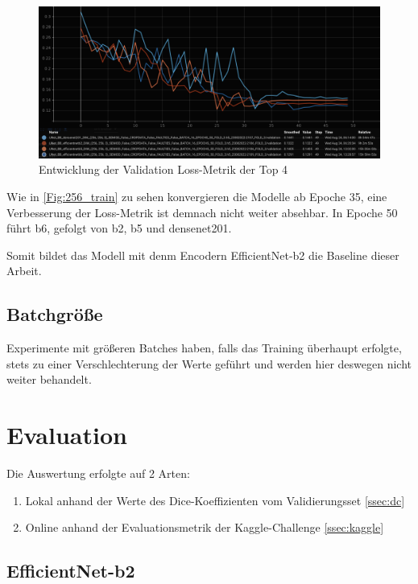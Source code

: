 \begin{figure}[H]
	\begin{center}
		\includegraphics[width=400pt]{LaTex/bilder/256_val_loss.png}
		\caption{Entwicklung der Validation Loss-Metrik der Top 4}\label{Fig:256_train}
	\end{center}
\end{figure}

Wie in \autoref{Fig:256_train} zu sehen konvergieren die Modelle ab Epoche 35, eine Verbesserung der Loss-Metrik ist demnach nicht weiter absehbar. In Epoche 50 führt b6, gefolgt von b2, b5 und densenet201. 

Somit bildet das Modell mit denm Encodern EfficientNet-b2 die Baseline dieser Arbeit.

\subsection{Batchgröße}

Experimente mit größeren Batches haben, falls das Training überhaupt erfolgte, stets zu einer Verschlechterung der Werte geführt und werden hier deswegen nicht weiter behandelt.

\pagebreak

\section{Evaluation}\raggedbottom

Die Auswertung erfolgte auf 2 Arten:
\begin{enumerate}
\item Lokal anhand der Werte des Dice-Koeffizienten vom Validierungsset \ref{ssec:dc}
\item Online anhand der Evaluationsmetrik der Kaggle-Challenge \ref{ssec:kaggle}
\end{enumerate}

\subsection{EfficientNet-b2}

